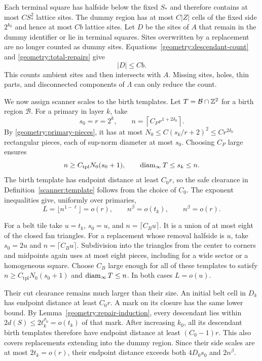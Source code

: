 Each terminal square has halfside below the fixed $S_*$ and therefore
contains at most $C S_*^2$ lattice sites.  The dummy region has at most
$C|Z|$ cells of the fixed side $2^{k_0}$ and hence at most $Cb$ lattice
sites.  Let $D$ be the sites of $A$ that remain in the dummy identifier or
lie in terminal squares.  Sites overwritten by a replacement are no
longer counted as dummy sites.  Equations~\eqref{geometry:descendant-count}
and \eqref{geometry:total-repairs} give
\begin{equation}
\label{geometry:bad-sites}
 |D|\le Cb.
\end{equation}
This counts ambient sites and then intersects with $A$.  Missing sites,
holes, thin parts, and disconnected components of $\Lambda$ can only
reduce the count.

We now assign scanner scales to the birth templates.  Let
$T=\mathcal B\cap\mathbb Z^2$ for a birth region $\mathcal B$.
For a primary in layer $k$, take
\begin{equation}
\label{geometry:primary-scale}
 s_0=r=2^k,\qquad n=\left\lceil C_P r^{1+2\delta_0}\right\rceil.
\end{equation}
By \eqref{geometry:primary-pieces}, it has at most
$N_0\le C(s_k/r+2)^2\le C r^{2\delta_0}$ rectangular pieces, each of
sup-norm diameter at most $s_0$.  Choosing $C_P$ large ensures
\[
 n\ge C_{\mathrm{tpl}}N_0(s_0+1),\qquad
 \operatorname{diam}_\infty T\le s_k\le n.
\]
The birth template has endpoint distance at least $C_0r$, so the safe
clearance in Definition~\ref{scanner:template} follows from the choice
of $C_0$.  The exponent inequalities give, uniformly over primaries,
\begin{equation}
\label{geometry:primary-limits}
 L=\lfloor n^{1-\ell}\rfloor=o(r),\qquad
 n^\beta=o(t_k),\qquad n^\beta=o(r).
\end{equation}

For a belt tile take $u=t_k$, $s_0=u$, and
$n=\lceil C_Bu\rceil$.  It is a union of at most eight of the closed fan
triangles.  For a replacement whose removal halfside is $u$, take
$s_0=2u$ and $n=\lceil C_Bu\rceil$.  Subdivision into the triangles from
the center to corners and midpoints again uses at most eight pieces,
including for a wide sector or a homogeneous square.  Choose $C_B$ large
enough for all of these templates to satisfy
$n\ge C_{\mathrm{tpl}}N_0(s_0+1)$ and $\operatorname{diam}_\infty T\le n$.
In both cases $L=o(u)$.

Their cut clearance remains much larger than their size.  An initial
belt cell in $D_k$ has endpoint distance at least $C_0r$.
A mark on its closure has the same lower bound.  By
Lemma~\ref{geometry:repair-induction}, every descendant lies within
$2d(S)\le2t_k^{\rho_0}=o(t_k)$ of that mark.  After increasing $k_0$, all
its descendant birth templates therefore have endpoint distance at least
$(C_0-1)r$.  This also covers replacements extending into the dummy
region.  Since their side scales are at most $2t_k=o(r)$, their endpoint
distance exceeds both $4D_0s_0$ and $2n^\beta$.

